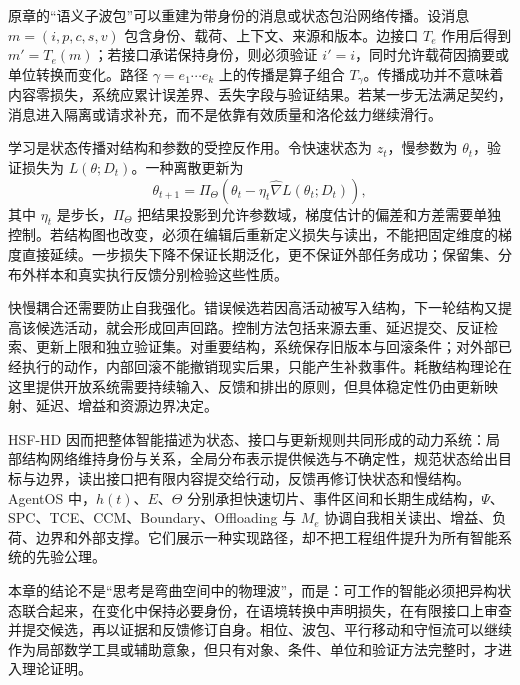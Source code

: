 原章的“语义子波包”可以重建为带身份的消息或状态包沿网络传播。设消息 $m=(i,p,c,s,v)$ 包含身份、载荷、上下文、来源和版本。边接口 $T_e$ 作用后得到 $m'=T_e(m)$；若接口承诺保持身份，则必须验证 $i'=i$，同时允许载荷因摘要或单位转换而变化。路径 $\gamma=e_1\cdots e_k$ 上的传播是算子组合 $T_\gamma$。传播成功并不意味着内容零损失，系统应累计误差界、丢失字段与验证结果。若某一步无法满足契约，消息进入隔离或请求补充，而不是依靠有效质量和洛伦兹力继续滑行。

学习是状态传播对结构和参数的受控反作用。令快速状态为 $z_t$，慢参数为 $\theta_t$，验证损失为 $L(\theta;D_t)$。一种离散更新为
\begin{equation}
 \theta_{t+1}=\Pi_{\Theta}\!\left(\theta_t-\eta_t\widehat\nabla L(\theta_t;D_t)\right),
\end{equation}
其中 $\eta_t$ 是步长，$\Pi_{\Theta}$ 把结果投影到允许参数域，梯度估计的偏差和方差需要单独控制。若结构图也改变，必须在编辑后重新定义损失与读出，不能把固定维度的梯度直接延续。一步损失下降不保证长期泛化，更不保证外部任务成功；保留集、分布外样本和真实执行反馈分别检验这些性质。

快慢耦合还需要防止自我强化。错误候选若因高活动被写入结构，下一轮结构又提高该候选活动，就会形成回声回路。控制方法包括来源去重、延迟提交、反证检索、更新上限和独立验证集。对重要结构，系统保存旧版本与回滚条件；对外部已经执行的动作，内部回滚不能撤销现实后果，只能产生补救事件。耗散结构理论在这里提供开放系统需要持续输入、反馈和排出的原则，但具体稳定性仍由更新映射、延迟、增益和资源边界决定。

HSF-HD 因而把整体智能描述为状态、接口与更新规则共同形成的动力系统：局部结构网络维持身份与关系，全局分布表示提供候选与不确定性，规范状态给出目标与边界，读出接口把有限内容提交给行动，反馈再修订快状态和慢结构。AgentOS 中，$h(t)$、$E$、$\Theta$ 分别承担快速切片、事件区间和长期生成结构，$\Psi$、SPC、TCE、CCM、Boundary、Offloading 与 $M_e$ 协调自我相关读出、增益、负荷、边界和外部支撑。它们展示一种实现路径，却不把工程组件提升为所有智能系统的先验公理。

本章的结论不是“思考是弯曲空间中的物理波”，而是：可工作的智能必须把异构状态联合起来，在变化中保持必要身份，在语境转换中声明损失，在有限接口上审查并提交候选，再以证据和反馈修订自身。相位、波包、平行移动和守恒流可以继续作为局部数学工具或辅助意象，但只有对象、条件、单位和验证方法完整时，才进入理论证明。
